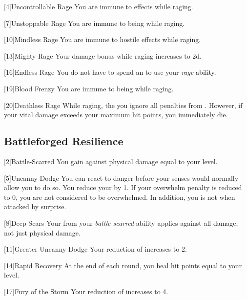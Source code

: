             [4]{Uncontrollable Rage}
            You are immune to  effects while raging.

            [7]{Unstoppable Rage}
            You are immune to being  while raging.

            [10]{Mindless Rage}
            You are immune to hostile  effects while raging.

            [13]{Mighty Rage}
            Your damage bonus while raging increases to \plus2d.

            [16]{Endless Rage} 
            You do not have to spend an  to use your \textit{rage} ability.

            [19]{Blood Frenzy} 
            You are immune to being  while raging.

            [20]{Deathless Rage} 
            While raging, the you ignore all penalties from .
            However, if your vital damage exceeds your maximum hit points, you immediately die.

        \subsection{Battleforged Resilience}
            [2]{Battle-Scarred} You gain  against physical damage equal to your level.

            [5]{Uncanny Dodge} You can react to danger before your senses would normally allow you to do so.
            You reduce your  by 1.
            If your overwhelm penalty is reduced to 0, you are not considered to be overwhelmed.
            In addition, you is not \unaware when attacked by surprise.

            [8]{Deep Scars} Your  from your \textit{battle-scarred} ability applies against all damage, not just physical damage.

            [11]{Greater Uncanny Dodge}
            Your reduction of  increases to 2.

            [14]{Rapid Recovery}
            At the end of each round, you heal hit points equal to your level.

            [17]{Fury of the Storm}
            Your reduction of  increases to 4.

